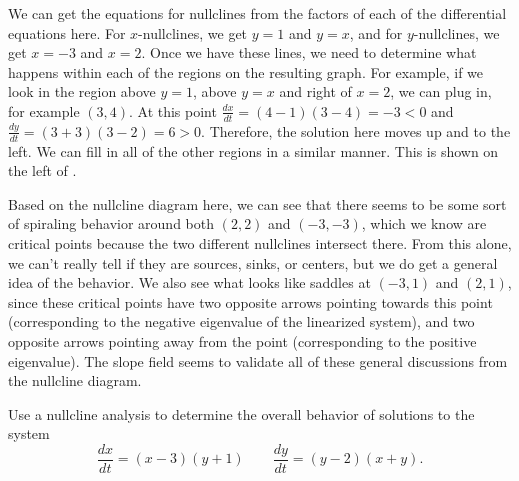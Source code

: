 \begin{exampleSol}
We can get the equations for nullclines from the factors of each of the differential equations here. For $x$-nullclines, we get $y=1$ and $y=x$, and for $y$-nullclines, we get $x=-3$ and $x=2$. Once we have these lines, we need to determine what happens within each of the regions on the resulting graph. For example, if we look in the region above $y=1$, above $y=x$ and right of $x=2$, we can plug in, for example $(3,4)$. At this point $\frac{dx}{dt} = (4-1)(3-4) = -3 < 0$ and $\frac{dy}{dt} = (3+3)(3-2) = 6 > 0$. Therefore, the solution here moves up and to the left. We can fill in all of the other regions in a similar manner. This is shown on the left of .

\begin{myfig}
\capstart
{}
\caption{Plots showing the nullcline diagram for  (left) and a slope field for the same differential equation (right). \label{fig:NCPlot1}}
\end{myfig}

Based on the nullcline diagram here, we can see that there seems to be some sort of spiraling behavior around both $(2,2)$ and $(-3, -3)$, which we know are critical points because the two different nullclines intersect there. From this alone, we can't really tell if they are sources, sinks, or centers, but we do get a general idea of the behavior. We also see what looks like saddles at $(-3, 1)$ and $(2, 1)$, since these critical points have two opposite arrows pointing towards this point (corresponding to the negative eigenvalue of the linearized system), and two opposite arrows pointing away from the point (corresponding to the positive eigenvalue). The slope field seems to validate all of these general discussions from the nullcline diagram.
\end{exampleSol}



\begin{example} \label{ex:Nullcline2}
Use a nullcline analysis to determine the overall behavior of solutions to the system
\begin{equation*}
\frac{dx}{dt} = (x-3)(y+1) \qquad \frac{dy}{dt} = (y-2)(x+y).
\end{equation*}
\end{example}

